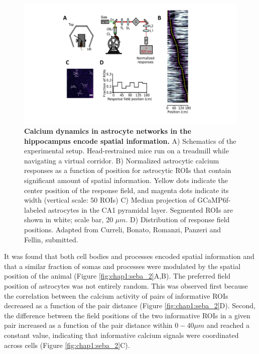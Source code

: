 \begin{figure}
    \centering
    \includegraphics[trim={150 50 200 0},clip,width=\textwidth]{Figures/Chapter1/intro_fig_seba_1.pdf}
    \caption[Calcium dynamics in astrocyte networks in the hippocampus encode spatial information]{\textbf{Calcium dynamics in astrocyte networks in the hippocampus encode spatial information.} 
    A) Schematics of the experimental setup. 
    Head-restrained mice run on a treadmill while navigating a virtual corridor. 
    B) Normalized astrocytic calcium responses as a function of position for astrocytic ROIs that contain significant amount of spatial information. 
    Yellow dots indicate the center position of the response field, and magenta dots indicate its width (vertical scale: 50 ROIs)
    C) Median projection of GCaMP6f-labeled astrocytes in the CA1 pyramidal layer. 
    Segmented ROIs are shown in white; scale bar, 20 $\mu m$. 
    D) Distribution of response field positions. 
    Adapted from Curreli, Bonato, Romanzi, Panzeri and Fellin, submitted.
    }
    \label{fig:chap1:seba_1}
\end{figure}
It was found that both cell bodies and processes encoded spatial information and that a similar fraction of somas and processes were modulated by the spatial position of the animal (Figure \ref{fig:chap1:seba_2}A,B).
The preferred field position of astrocytes was not entirely random.
This was observed first because the correlation between the calcium activity of pairs of informative ROIs decreased as a function of the pair distance (Figure \ref{fig:chap1:seba_2}D).
Second, the difference between the field positions of the two informative ROIs in a given pair increased as a function of the pair distance within $0-40 \mu m$ and reached a constant value, indicating that informative calcium signals were coordinated across cells (Figure \ref{fig:chap1:seba_2}C).
